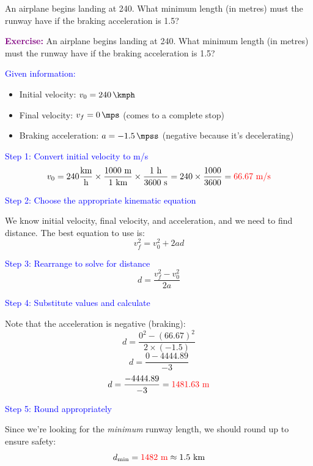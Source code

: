 \begin{exercise}
    An airplane begins landing at \qty{240}{\kmph}.
    What minimum length (in metres) must the runway have if the braking acceleration is \qty{1.5}{\mpss}?
    \begin{solu}
        \textbf{\textcolor{purple}{Exercise:}} An airplane begins landing at \qty{240}{\kmph}.
        What minimum length (in metres) must the runway have if the braking acceleration is \qty{1.5}{\mpss}?

        \vspace{0.3cm}

        \textcolor{blue}{Given information:}
        \begin{itemize}
            \item Initial velocity: $v_0 = \qty{240}{\kmph}$
            \item Final velocity: $v_f = \qty{0}{\mps}$ (comes to a complete stop)
            \item Braking acceleration: $a = \qty{-1.5}{\mpss}$ (negative because it's decelerating)
        \end{itemize}

        \textcolor{blue}{Step 1: Convert initial velocity to m/s}
        \[
            v_0 = 240 \frac{\text{km}}{\text{h}} \times \frac{1000 \text{ m}}{1 \text{ km}} \times \frac{1 \text{ h}}{3600 \text{ s}} = 240 \times \frac{1000}{3600} = \textcolor{red}{66.67 \text{ m/s}}
        \]

        \textcolor{blue}{Step 2: Choose the appropriate kinematic equation}

        We know initial velocity, final velocity, and acceleration, and we need to find distance. The best equation to use is:
        \[
            \boxed{v_f^2 = v_0^2 + 2ad}
        \]

        \textcolor{blue}{Step 3: Rearrange to solve for distance}
        \[
            d = \frac{v_f^2 - v_0^2}{2a}
        \]

        \textcolor{blue}{Step 4: Substitute values and calculate}

        Note that the acceleration is negative (braking):
        \[
            d = \frac{0^2 - (66.67)^2}{2 \times (-1.5)}
        \]
        \[
            d = \frac{0 - 4444.89}{-3}
        \]
        \[
            d = \frac{-4444.89}{-3} = \textcolor{red}{1481.63 \text{ m}}
        \]

        \textcolor{blue}{Step 5: Round appropriately}

        Since we're looking for the \textit{minimum} runway length, we should round up to ensure safety:
        \[
            d_{\text{min}} = \textcolor{red}{1482 \text{ m}} \approx 1.5 \text{ km}
        \]


\end{solu}
\end{exercise}
